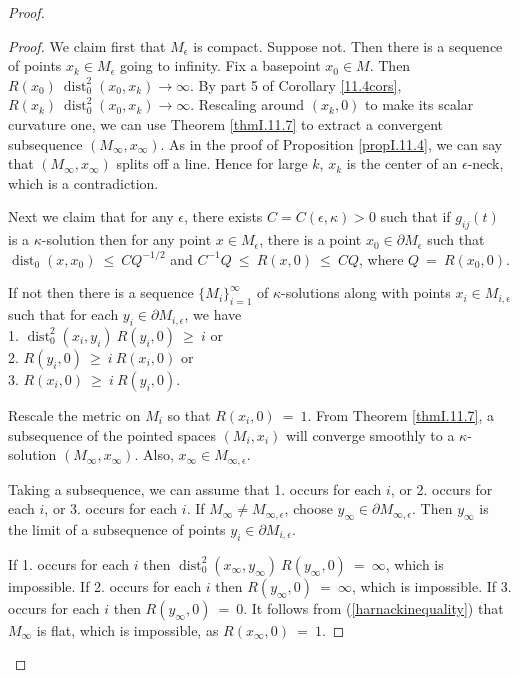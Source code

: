 \documentclass[12pt]{amsart}
\newcommand{\dist}{\operatorname{dist}}
\numberwithin{equation}{section}
\theoremstyle{plain}
\theoremstyle{definition}
\theoremstyle{remark}
\begin{document}
\begin{proof}
\begin{proof}
We claim first that $M_\epsilon$ is compact.  Suppose not.
Then there is a sequence of points $x_k \in M_\epsilon$ going to
infinity. Fix a basepoint $x_0 \in M$. Then
$R(x_0) \: \dist_0^2(x_0, x_k) \rightarrow \infty$. By
part 5 of Corollary \ref{11.4cors},
$R(x_k) \: \dist_0^2(x_0, x_k) \rightarrow \infty$.  Rescaling
around $(x_k, 0)$ to make its scalar curvature one, we can use 
Theorem \ref{thmI.11.7} to extract a convergent subsequence
$(M_\infty, x_\infty)$.
As in the proof of Proposition \ref{propI.11.4}, we can say that 
$(M_\infty, x_\infty)$ splits off a line.  Hence for large $k$,
$x_k$ is the center of an $\epsilon$-neck, which is a contradiction.

Next we claim that for any $\epsilon$, there exists
$C = C(\epsilon, \kappa) > 0$ such that if $g_{ij}(t)$ is a $\kappa$-solution 
then for
any point $x \in M_\epsilon$, there is a point $x_0 \in
\partial M_\epsilon$ such that $\dist_0(x, x_0) \: \le \: CQ^{-1/2}$
and $C^{-1} Q \: \le \: R(x, 0) \: \le \: CQ$, where
$Q \: = \: R(x_0, 0)$.

If not then there is a sequence $\{M_i\}_{i=1}^\infty$
of $\kappa$-solutions along with points
$x_i \in M_{i,\epsilon}$ such that for each $y_i \in 
\partial M_{i,\epsilon}$, we have \\
1. $\dist_0^2(x_i, y_i) \: R(y_i, 0) \: \ge \: i$ or \\
2. $R(y_i, 0) \: \ge \: i \: R(x_i, 0)$ or \\
3. $R(x_i, 0) \: \ge \: i \: R(y_i, 0)$. 

Rescale the metric on $M_i$ so that $R(x_i, 0) \: = \: 1$. From
Theorem \ref{thmI.11.7}, a subsequence of the pointed spaces
$(M_i, x_i)$ will converge smoothly to a $\kappa$-solution
$(M_\infty, x_\infty)$. Also, $x_\infty \in M_{\infty, \epsilon}$.

Taking a subsequence, we
can assume that 1. occurs for each $i$, or 2. occurs for each $i$,
or 3. occurs for each $i$. If $M_\infty \neq M_{\infty, \epsilon}$, 
choose $y_\infty \in
\partial M_{\infty,\epsilon}$. Then $y_\infty$ is the limit of
a subsequence of points $y_i \in \partial M_{i,\epsilon}$. 

If 1. occurs for each $i$ then $\dist_0^2(x_\infty, y_\infty) \: 
R(y_\infty, 0) \: = \: \infty$, which is impossible. 
If 2. occurs for each $i$ then $R(y_\infty, 0) \: = \: \infty$, which
is impossible.
If 3. occurs for each $i$ then $R(y_\infty, 0) \: = \: 0$.
It follows from (\ref{harnackinequality}) that $M_\infty$ is flat,
which is impossible, as $R(x_\infty, 0) \: = \: 1$.


\end{proof}
\end{proof}
\end{document}
